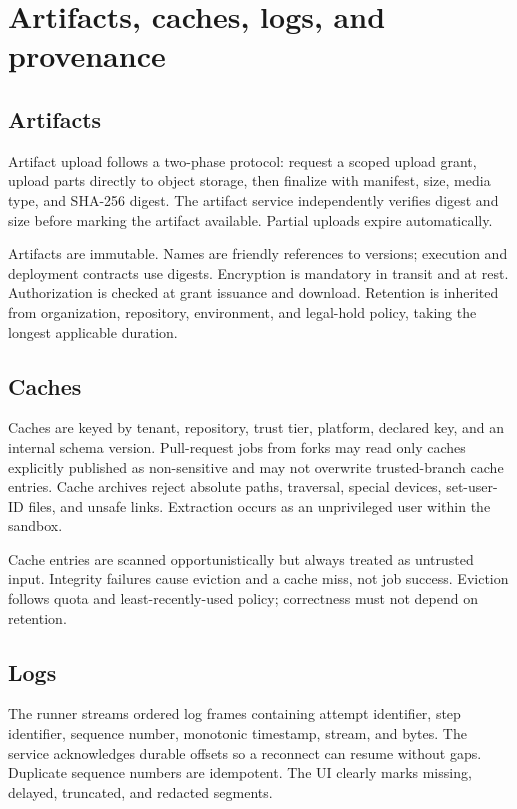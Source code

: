 \section{Artifacts, caches, logs, and provenance}

\subsection{Artifacts}

Artifact upload follows a two-phase protocol: request a scoped upload grant, upload
parts directly to object storage, then finalize with manifest, size, media type, and
SHA-256 digest. The artifact service independently verifies digest and size before
marking the artifact available. Partial uploads expire automatically.

Artifacts are immutable. Names are friendly references to versions; execution and
deployment contracts use digests. Encryption is mandatory in transit and at rest.
Authorization is checked at grant issuance and download. Retention is inherited from
organization, repository, environment, and legal-hold policy, taking the longest
applicable duration.

\subsection{Caches}

Caches are keyed by tenant, repository, trust tier, platform, declared key, and an
internal schema version. Pull-request jobs from forks may read only caches explicitly
published as non-sensitive and may not overwrite trusted-branch cache entries. Cache
archives reject absolute paths, traversal, special devices, set-user-ID files, and
unsafe links. Extraction occurs as an unprivileged user within the sandbox.

Cache entries are scanned opportunistically but always treated as untrusted input.
Integrity failures cause eviction and a cache miss, not job success. Eviction follows
quota and least-recently-used policy; correctness must not depend on retention.

\subsection{Logs}

The runner streams ordered log frames containing attempt identifier, step identifier,
sequence number, monotonic timestamp, stream, and bytes. The service acknowledges
durable offsets so a reconnect can resume without gaps. Duplicate sequence numbers are
idempotent. The UI clearly marks missing, delayed, truncated, and redacted segments.

